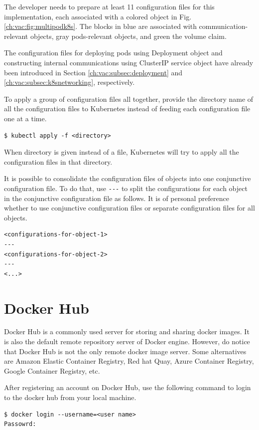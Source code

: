 The developer needs to prepare at least 11 configuration files for this implementation, each associated with a colored object in  Fig. \ref{ch:vac:fig:multipodk8s}. The blocks in blue are associated with communication-relevant objects, gray pods-relevant objects, and green the volume claim.

The configuration files for deploying pods using Deployment object and constructing internal communications using ClusterIP service object have already been introduced in Section \ref{ch:vac:subsec:deployment} and \ref{ch:vac:subsec:k8snetworking}, respectively. 

To apply a group of configuration files all together, provide the directory name of all the configuration files to Kubernetes instead of feeding each configuration file one at a time.
\begin{lstlisting}
$ kubectl apply -f <directory>
\end{lstlisting}
When directory is given instead of a file, Kubernetes will try to apply all the configuration files in that directory.

It is possible to consolidate the configuration files of objects into one conjunctive configuration file. To do that, use \verb|---| to split the configurations for each object in the conjunctive configuration file as follows. It is of personal preference whether to use conjunctive configuration files or separate configuration files for all objects.
\begin{lstlisting}
<configurations-for-object-1>
---
<configurations-for-object-2>
---
<...>
\end{lstlisting}













\section{Docker Hub}

Docker Hub is a commonly used server for storing and sharing docker images. It is also the default remote repository server of Docker engine. However, do notice that Docker Hub is not the only remote docker image server. Some alternatives are Amazon Elastic Container Registry, Red hat Quay, Azure Container Registry, Google Container Registry, etc.

After registering an account on Docker Hub, use the following command to login to the docker hub from your local machine.
\begin{lstlisting}
$ docker login --username=<user name>
Passowrd:
\end{lstlisting}

